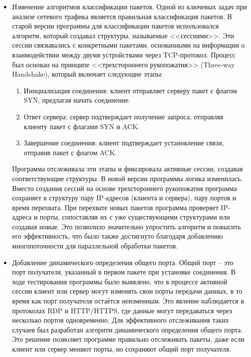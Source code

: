 \documentclass[spec, och, diploma]{SCWorks}
\begin{document}
\begin{itemize}
  \item Изменение алгоритмов классификации пакетов. Одной из ключевых задач при анализе сетевого трафика является правильная 
  классификация пакетов. В старой версии программы для классификации пакетов использовался алгоритм, который создавал структуры, называемые <<сессиями>>. 
  Эти сессии связывались с конкретными пакетами, основанными на информации о взаимодействии между двумя устройствами через TCP-протокол. Процесс был 
  основан на принципе <<трехстороннего рукопожатия>> (Three-way Handshake), который включает следующие этапы:
  \begin{enumerate}
    \item Инициализация соединения: клиент отправляет серверу пакет с флагом SYN, предлагая начать соединение.
    \item Ответ сервера: сервер подтверждает получение запроса, отправляя клиенту пакет с флагами SYN и ACK.
    \item Завершение соединения: клиент подтверждает установление связи, отправив пакет с флагом ACK.
  \end{enumerate}

  Программа отслеживала эти этапы и фиксировала активные сессии, создавая соответствующие структуры. В новой версии программы логика изменилась. 
  Вместо создания сессий на основе трехстороннего рукопожатия программа сохраняет в структуру пару IP-адресов (клиента и сервера), пару портов и время 
  перехвата. При перехвате новых пакетов программа проверяет IP-адреса и порты, сопоставляя их с уже существующими структурами или создавая новые. Это 
  позволило значительно упростить алгоритм и повысить его эффективность, что было также достигнуто благодаря добавлению многопоточности для параллельной 
  обработки пакетов.

  \item Добавление динамического определения общего порта. Общий порт -- это порт получателя, указанный в первом пакете при установке соединения. 
  В ходе тестирования программы было выявлено, что в процессе активной сессии клиент или сервер могут изменять свои порты передачи данных, в то время как 
  порт получателя остаётся неизменным. Это явление наблюдается в протоколах RDP и HTTP/HTTPS, где данные могут передаваться через несколько портов 
  одновременно. Для эффективного отслеживания таких случаев был разработан алгоритм динамического определения общего порта. Это решение позволяет 
  программе правильно отслеживать пакеты, даже если клиент или сервер меняют порты, но сохраняют общий порт получателя.


\end{itemize}
\end{document}
